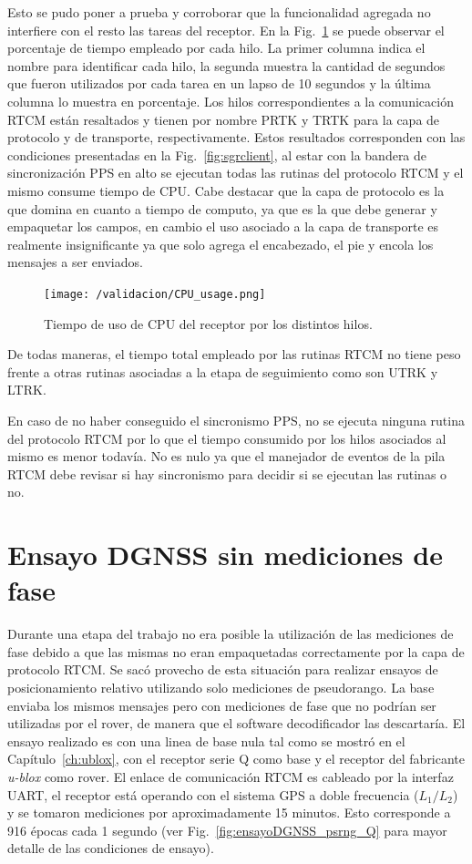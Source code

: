 \documentclass[a4paper,12pt,oneside,onecolumn,final,openright]{book}%
\begin{document}
	Esto se pudo poner a prueba y corroborar que la funcionalidad agregada no interfiere con el resto las tareas del receptor. En la Fig.~\ref{fig:CPU_usage} se puede observar el porcentaje de tiempo empleado por cada hilo. La primer columna indica el nombre para identificar cada hilo, la segunda muestra la cantidad de segundos que fueron utilizados por cada tarea en un lapso de 10 segundos y la última columna lo muestra en porcentaje. Los hilos correspondientes a la comunicación RTCM están resaltados y tienen por nombre PRTK y TRTK para la capa de protocolo y de transporte, respectivamente. Estos resultados corresponden con las condiciones presentadas en la Fig.~\ref{fig:sgrclient}, al estar con la bandera de sincronización PPS en alto se ejecutan todas las rutinas del protocolo RTCM y el mismo consume tiempo de CPU. Cabe destacar que la capa de protocolo es la que domina en cuanto a tiempo de computo, ya que es la que debe generar y empaquetar los campos, en cambio el uso asociado a la capa de transporte es realmente insignificante ya que solo agrega el encabezado, el pie y encola los mensajes a ser enviados. 
\begin{figure}
    \centering
	\texttt{[image: /validacion/CPU\_usage.png]}
    \caption{Tiempo de uso de CPU del receptor por los distintos hilos.}
    \label{fig:CPU_usage}
\end{figure}
	De todas maneras, el tiempo total empleado por las rutinas RTCM no tiene peso frente a otras rutinas asociadas a la etapa de seguimiento como son UTRK y LTRK.
	
	En caso de no haber conseguido el sincronismo PPS, no se ejecuta ninguna rutina del protocolo RTCM por lo que el tiempo consumido por los hilos asociados al mismo es menor todavía. No es nulo ya que el manejador de eventos de la pila RTCM debe revisar si hay sincronismo para decidir si se ejecutan las rutinas o no.
\section{Ensayo DGNSS sin mediciones de fase}
	Durante una etapa del trabajo no era posible la utilización de las mediciones de fase debido a que las mismas no eran empaquetadas correctamente por la capa de protocolo RTCM. Se sacó provecho de esta situación para realizar ensayos de posicionamiento relativo utilizando solo mediciones de pseudorango. La base enviaba los mismos mensajes pero con mediciones de fase que no podrían ser utilizadas por el rover, de manera que el software decodificador las descartaría. El ensayo realizado es con una linea de base nula tal como se mostró en el Capítulo~\ref{ch:ublox}, con el receptor serie Q como base y el receptor del fabricante \textit{u-blox} como rover. El enlace de comunicación RTCM es cableado por la interfaz UART, el receptor está operando con el sistema GPS a doble frecuencia ($L_1/L_2$) y se tomaron mediciones por aproximadamente 15 minutos. Esto corresponde a 916 épocas cada 1 segundo (ver Fig.~\ref{fig:ensayoDGNSS_psrng_Q} para mayor detalle de las condiciones de ensayo).
	
\end{document}
